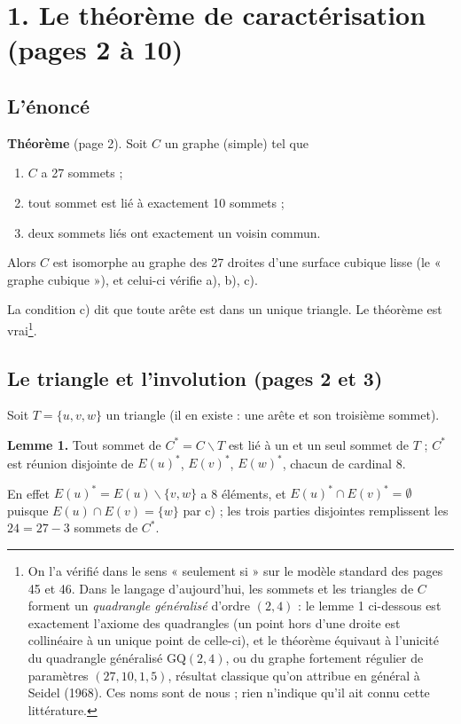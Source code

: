 \documentclass[11pt,a4paper]{article}
\begin{document}
\section*{1. Le théorème de caractérisation (pages 2 à 10)}

\subsection*{L'énoncé}

\textbf{Théorème} (page 2). Soit $C$ un graphe (simple) tel que

\begin{enumerate}
\item[a)] $C$ a 27 sommets ;
\item[b)] tout sommet est lié à exactement 10 sommets ;
\item[c)] deux sommets liés ont exactement un voisin commun.
\end{enumerate}

Alors $C$ est isomorphe au graphe des 27 droites d'une surface cubique lisse
(le « graphe cubique »), et celui-ci vérifie a), b), c).

La condition c) dit que toute arête est dans un unique triangle. Le théorème
est vrai\footnote{On l'a vérifié dans le sens « seulement si » sur le modèle
standard des pages 45 et 46. Dans le langage d'aujourd'hui, les sommets et les
triangles de $C$ forment un \emph{quadrangle généralisé} d'ordre $(2, 4)$ : le
lemme 1 ci-dessous est exactement l'axiome des quadrangles (un point hors
d'une droite est collinéaire à un unique point de celle-ci), et le théorème
équivaut à l'unicité du quadrangle généralisé $\mathrm{GQ}(2, 4)$, ou du graphe
fortement régulier de paramètres $(27, 10, 1, 5)$, résultat classique qu'on
attribue en général à Seidel (1968). Ces noms sont de nous ; rien n'indique
qu'il ait connu cette littérature.}.

\subsection*{Le triangle et l'involution (pages 2 et 3)}

Soit $T = \lbrace u, v, w\rbrace$ un triangle (il en existe : une arête et son
troisième sommet).

\textbf{Lemme 1.} Tout sommet de $C^* = C \smallsetminus T$ est lié à un et un
seul sommet de $T$ ; $C^*$ est réunion disjointe de $E(u)^*$, $E(v)^*$,
$E(w)^*$, chacun de cardinal 8.

En effet $E(u)^* = E(u) \smallsetminus \lbrace v, w\rbrace$ a 8 éléments, et
$E(u)^* \cap E(v)^* = \emptyset$ puisque $E(u) \cap E(v) = \lbrace w\rbrace$
par c) ; les trois parties disjointes remplissent les $24 = 27 - 3$ sommets de
$C^*$.
\end{document}
